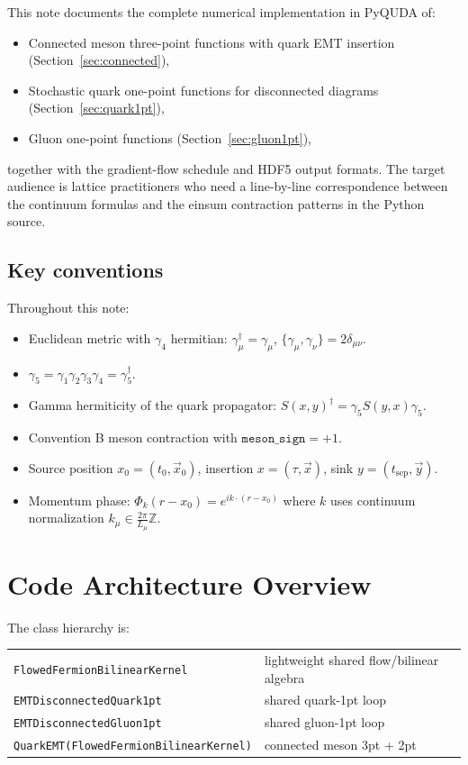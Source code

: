 \documentclass[11pt,a4paper]{article}
\newcommand{\code}[1]{\texttt{#1}}
\begin{document}
This note documents the complete numerical implementation in PyQUDA of:
\begin{itemize}[nosep]
  \item Connected meson three-point functions with quark EMT insertion (Section~\ref{sec:connected}),
  \item Stochastic quark one-point functions for disconnected diagrams (Section~\ref{sec:quark1pt}),
  \item Gluon one-point functions (Section~\ref{sec:gluon1pt}),
\end{itemize}
together with the gradient-flow schedule and HDF5 output formats. The target audience is lattice practitioners who need a line-by-line correspondence between the continuum formulas and the einsum contraction patterns in the Python source.

\subsection*{Key conventions}
Throughout this note:
\begin{itemize}[nosep]
  \item Euclidean metric with $\gamma_4$ hermitian: $\gamma_\mu^\dagger = \gamma_\mu$, $\{\gamma_\mu,\gamma_\nu\} = 2\delta_{\mu\nu}$.
  \item $\gamma_5 = \gamma_1\gamma_2\gamma_3\gamma_4 = \gamma_5^\dagger$.
  \item Gamma hermiticity of the quark propagator: $S(x,y)^\dagger = \gamma_5 S(y,x) \gamma_5$.
  \item Convention B meson contraction with $\code{meson\_sign} = +1$.
  \item Source position $x_0 = (t_0, \vec{x}_0)$, insertion $x = (\tau, \vec{x})$, sink $y = (t_{\text{sep}}, \vec{y})$.
  \item Momentum phase: $\Phi_k(r - x_0) = e^{i k \cdot (r - x_0)}$ where $k$ uses continuum normalization $k_\mu \in \frac{2\pi}{L_\mu}\mathbb{Z}$.
\end{itemize}


\section{Code Architecture Overview}

The class hierarchy is:
\begin{center}
\begin{tabular}{ll}
  \code{FlowedFermionBilinearKernel} & lightweight shared flow/bilinear algebra \\
  \code{EMTDisconnectedQuark1pt} & shared quark-1pt loop \\
  \code{EMTDisconnectedGluon1pt} & shared gluon-1pt loop \\
  \code{QuarkEMT(FlowedFermionBilinearKernel)} & connected meson 3pt + 2pt \\
\end{tabular}
\end{center}
\end{document}
